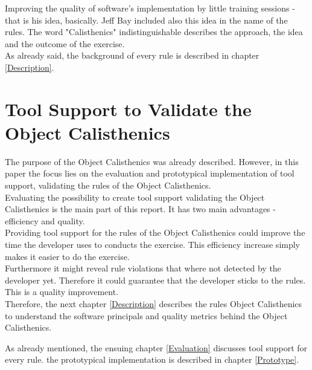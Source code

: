 Improving the quality of software's implementation by little training sessions - that is his idea, basically. Jeff Bay included also this idea in the name of the rules. The word "Calisthenics" indistinguishable describes the approach, the idea and the outcome of the exercise.\\

As already said, the background of every rule is described in chapter \ref{Description}.

\section{Tool Support to Validate the Object Calisthenics}



The purpose of the Object Calisthenics was already described. However, in this paper the focus lies on the evaluation and prototypical implementation of tool support, validating the rules of the Object Calisthenics. \\

Evaluating the possibility to create tool support validating the Object Calisthenics is the main part of this report. It has two main advantages - efficiency and quality.\\

Providing tool support for the rules of the Object Calisthenics could improve the time the developer uses to conducts the exercise. This efficiency increase simply makes it easier to do the exercise.\\

Furthermore it might reveal rule violations that where not detected by the developer yet. Therefore it could guarantee that the developer sticks to the rules. This is a quality improvement. \\

Therefore, the next chapter  \ref{Description} describes the rules Object Calisthenics to understand the software principals and quality metrics behind the Object Calisthenics. 

As already mentioned, the ensuing chapter \ref{Evaluation} discusses tool support for every rule.  the prototypical implementation is described in chapter \ref{Prototype}.

